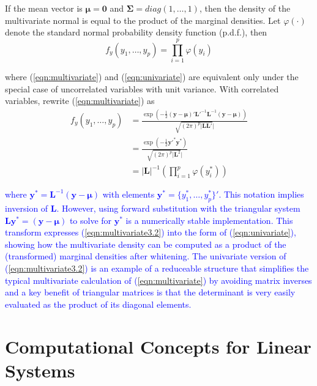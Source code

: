 \documentclass[12pt]{article}
\begin{document}
\noindent If the mean vector is $\bm{\mu} = \bm{0}$ and $\bm{\Sigma} = diag(1, \ldots, 1)$, then the density of the multivariate normal is equal to the product of the marginal densities. Let $\varphi(\cdot)$ denote the standard normal probability density function (p.d.f.), then
\begin{equation}
\label{eqn:univariate}
f_y(y_1, \ldots, y_p)  =  \prod_{i=1}^p\varphi(y_i)
\end{equation}

\noindent where (\ref{eqn:multivariate}) and (\ref{eqn:univariate}) are equivalent only under the special case of uncorrelated variables with unit variance. With correlated variables, rewrite (\ref{eqn:multivariate}) as
\begin{align}
\label{eqn:multivariate2}
f_y(y_1, \ldots, y_p)  & =  \frac{\exp(-\frac{1}{2}(\bm{y} - \bm{\mu})'\bm{L}'^{-1}\bm{L}^{-1}(\bm{y} - \bm{\mu}))}{\sqrt{(2\pi)^p|\bm{L}\bm{L}'}|}\\
				&=  \frac{\exp(-\frac{1}{2}\bm{y}'^{*}\bm{y}^{*}  )}{\sqrt{(2\pi)^p|\bm{L}^2}|} \label{eqn:multivariate3.1}\\
				& =  |\bm{L}|^{-1}\left(\prod_{i=1}^p\varphi(y^*_i)\right) \label{eqn:multivariate3.2}
\end{align}

\noindent \textcolor{blue}{where $\bm{y}^* = \bm{L}^{-1}(\bm{y}-\bm{\mu})$ with elements $\bm{y}^{*} = \{y_1^*, \ldots, y_p^*\}'$. This notation implies inversion of $\bm{L}$. However, using forward substitution with the triangular system $\bm{L}\bm{y}^* = (\bm{y}-\bm{\mu})$ to solve for $\bm{y}^*$ is a numerically stable implementation. This transform expresses (\ref{eqn:multivariate3.2}) into the form of (\ref{eqn:univariate}), showing how the multivariate density can be computed as a product of the (transformed) marginal densities after whitening. The univariate version of (\ref{eqn:multivariate3.2}) is an example of a reduceable structure that simplifies the typical multivariate calculation of (\ref{eqn:multivariate}) by avoiding matrix inverses and a key benefit of triangular matrices is that the determinant is very easily evaluated as the product of its diagonal elements.}

\section*{Computational Concepts for Linear Systems}
\end{document}
